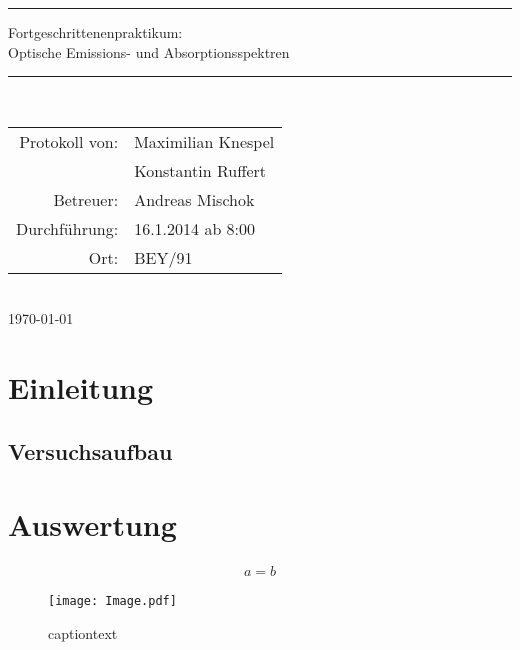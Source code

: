 \documentclass[12pt,a4paper,twoside]{article}
\begin{document}
\begin{titlepage}
\begin{center}
\rule{\textwidth}{3px}
\Huge{
Fortgeschrittenenpraktikum:\\
Optische Emissions- und Absorptionsspektren}\\[-12pt]
\rule{\textwidth}{3px}\\[3cm]

\vfill

\large
\begin{tabular}{rl}
	Protokoll von: & Maximilian Knespel\\
	& Konstantin Ruffert\\
	Betreuer: & Andreas Mischok\\ %
	Durchführung: & 16.1.2014 ab 8:00\\
	Ort: & BEY/91
\end{tabular}\\[3cm]
{\large \today}
\end{center}
\end{titlepage}

\newpage

\tableofcontents
\newpage


\section{Einleitung}


\subsection{Versuchsaufbau}


\section{Auswertung}

\begin{eqnarray}
	\label{eq:n}
	 a = b
\end{eqnarray}

\begin{figure}
	\centering
	\begin{minipage}{0.7 \linewidth}
		\texttt{[image: Image.pdf]}
	\end{minipage}
	\caption{captiontext}
	\label{fig:RTn}
\end{figure}
\end{document}
